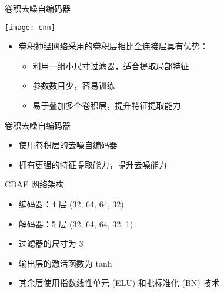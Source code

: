 \documentclass{beamer}
\begin{document}
\begin{frame}[t]
  \begin{alertblock}{卷积去噪自编码器}
  \end{alertblock}
  \begin{center}
    \texttt{[image: cnn]}
  \end{center}
  \vspace{-1ex}
  \begin{itemize}
    \item 卷积神经网络采用的\alert{卷积层}相比\alert{全连接层}具有优势：
      \begin{itemize}
        \item 利用一组小尺寸过滤器，适合提取局部特征
        \item 参数数目少，容易训练
        \item 易于叠加多个卷积层，提升特征提取能力
      \end{itemize}
  \end{itemize}
  \begin{alertblock}{卷积去噪自编码器}
    \vspace{-1ex}
    \begin{itemize}
      \item 使用卷积层的去噪自编码器
      \item 拥有更强的特征提取能力，提升去噪能力
    \end{itemize}
  \end{alertblock}
\end{frame}

\begin{frame}[t]
  \begin{alertblock}{CDAE 网络架构}
  \end{alertblock}
  \begin{itemize}
    \item 编码器：4 层 (32, 64, 64, 32)
    \item 解码器：5 层 (32, 64, 64, 32, 1)
    \item 过滤器的尺寸为 3
    \item 输出层的激活函数为 \alert{tanh}
    \item 其余层使用\alert{指数线性单元} (ELU) 和\alert{批标准化} (BN) 技术
  \end{itemize}
  \begin{figure}
  \end{figure}
\end{frame}
\end{document}
